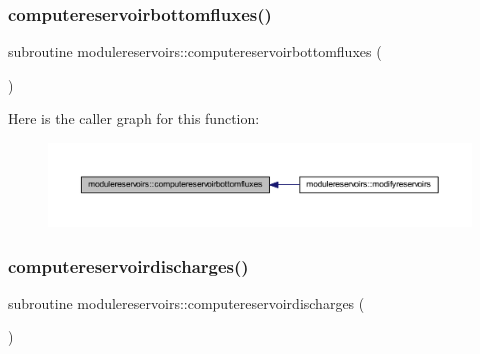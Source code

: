 \subsubsection{\texorpdfstring{computereservoirbottomfluxes()}{computereservoirbottomfluxes()}}
{\footnotesize\ttfamily subroutine modulereservoirs\+::computereservoirbottomfluxes (\begin{DoxyParamCaption}{ }\end{DoxyParamCaption})\hspace{0.3cm}{\ttfamily [private]}}

Here is the caller graph for this function\+:\nopagebreak
\begin{figure}[H]
\begin{center}
\leavevmode
\includegraphics[width=350pt]{namespacemodulereservoirs_af226bfc3156ffdd375d5b81401036b46_icgraph}
\end{center}
\end{figure}
\mbox{\label{namespacemodulereservoirs_a8a99c19b113e1731bd473173c164300a}} 
\subsubsection{\texorpdfstring{computereservoirdischarges()}{computereservoirdischarges()}}
{\footnotesize\ttfamily subroutine modulereservoirs\+::computereservoirdischarges (\begin{DoxyParamCaption}{ }\end{DoxyParamCaption})\hspace{0.3cm}{\ttfamily [private]}}

